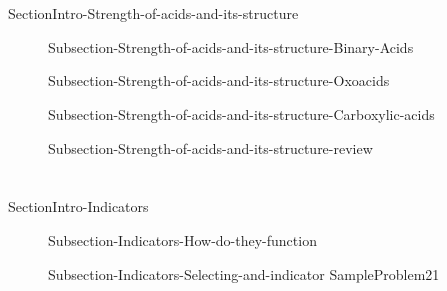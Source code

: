 \documentclass[main.tex]{subfiles}
\begin{document}
 \section{\color{blue!30!black}{Molecular mechanisms behind acid-base strength}}{SectionIntro-Strength-of-acids-and-its-structure}
\sloppy\begin{description}
\item[] {Subsection-Strength-of-acids-and-its-structure-Binary-Acids}
\item[] {Subsection-Strength-of-acids-and-its-structure-Oxoacids}
\item[] {Subsection-Strength-of-acids-and-its-structure-Carboxylic-acids}
\item[] {Subsection-Strength-of-acids-and-its-structure-review}
 \end{description}

  \section{\color{blue!30!black}{Indicators}}{SectionIntro-Indicators}
\sloppy\begin{description}
\item[] {Subsection-Indicators-How-do-they-function}
\item[] {Subsection-Indicators-Selecting-and-indicator}
   {SampleProblem21}

 \end{description}
 

\end{document}

